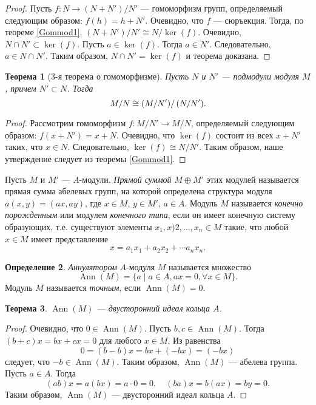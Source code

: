 \documentclass[12pt, titlepage, oneside]{amsbook}
\newcommand{\Ann}{\operatorname{Ann}}
\newtheorem{theorem}{Теорема}[chapter]
\theoremstyle{definition}
\newtheorem{definition}[theorem]{Определение}
\theoremstyle{remark}
\begin{document}
\begin{proof}
	Пусть $f\colon N\rightarrow (N+N')/N'$ --- гомоморфизм групп,
	определяемый следующим образом: $f(h)=h+N'$. Очевидно, что $f$ ---
	сюръекция. Тогда, по теореме \ref{Gommod1}, $(N+N')/N'\cong N/\ker(f)$.
	Очевидно, $N\cap N'\subset\ker(f)$. Пусть $a\in\ker(f)$. Тогда $a\in
		N'$. Следовательно, $a\in N\cap N'$. Таким образом, $N\cap N'=\ker(f)$
	и теорема доказана.
\end{proof}

\begin{theorem}[3-я теорема о гомоморфизме]
	\label{Gommod3} Пусть $N$ и $N'$ --- подмодули модуля $M$,
	причем $N'\subset N$. Тогда $$\left. M/N\cong (M/N')\right/(N/N').$$
\end{theorem}

\begin{proof}
	Рассмотрим гомоморфизм $f\colon M/N'\rightarrow M/N$, определяемый
	следующим образом: $f(x+N')=x+N$. Очевидно, что $\ker(f)$ состоит из
	всех $x+N'$ таких, что $x\in N$. Следовательно, $\ker(f)\cong N/N'$.
	Таким образом, наше утверждение следует из теоремы \ref{Gommod1}.
\end{proof}

Пусть $M$ и $M'$ --- $A$-модули. \emph{Прямой суммой} $M\oplus M'$ этих модулей называется прямая сумма абелевых групп, на которой определена структура модуля $a(x,y)=(ax,ay)$, где $x\in M$, $y\in M'$, $a\in A$.
Модуль $M$ называется \emph{конечно порожденным} или модулем \emph{конечного типа}, если он имеет конечную систему образующих, т.е. существуют элементы $x_1,x)2,\ldots,x_n\in M$ такие, что любой $x\in M$ имеет представление $$x=a_1x_1+a_2x_2+\cdots a_nx_n.$$

\begin{definition}
	\emph{Аннулятором} $A$-модуля $M$ называется множество $$\Ann(M)=\{a\mid a\in A, ax=0,\forall x\in M\}.$$ Модуль $M$ называется \emph{точным}, если $\Ann(M)=0$.
\end{definition}

\begin{theorem}
	\label{Mod1} $\Ann(M)$ --- двусторонний идеал кольца $A$.
\end{theorem}

\begin{proof}
	Очевидно, что $0\in\Ann(M)$. Пусть $b,c\in\Ann(M)$. Тогда $(b+c)x=bx+cx=0$ для любого $x\in M$. Из равенства $$0=(b-b)x=bx+(-bx)=(-bx)$$ следует, что $-b\in\Ann(M)$. Таким образом, $\Ann(M)$ --- абелева группа. Пусть $a\in A$. Тогда $$(ab)x=a(bx)=a\cdot 0=0,\quad (ba)x=b(ax)=by=0.$$ Таким образом, $\Ann(M)$ --- двусторонний идеал кольца $A$.
\end{proof}
\end{document}
